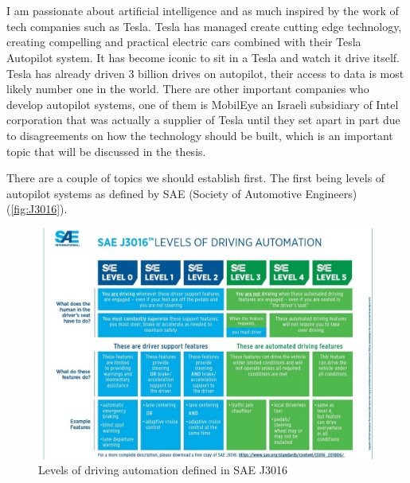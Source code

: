 \chapter{\bevezetes}

I am passionate about artificial intelligence and as much inspired by the
work of tech companies such as Tesla. Tesla has managed create cutting edge
technology, creating compelling and practical electric cars combined with their
Tesla Autopilot system. It has become iconic to sit in a Tesla and watch it
drive itself. Tesla has already driven 3 billion drives on autopilot, their
access to data is most likely number one in the world. There are other important
companies who develop autopilot systems, one of them is MobilEye an Israeli
subsidiary of Intel corporation that was actually a supplier of Tesla until they
set apart in part due to disagreements on how the technology should be built,
which is an important topic that will be discussed in the thesis.

There are a couple of topics we should establish first. The first being levels
of autopilot systems as defined by SAE (Society of Automotive Engineers)
(\autoref{fig:J3016}). 

\begin{figure}[!ht]
    \centering
    \includegraphics[width=150mm, keepaspectratio]{figures/levels-of-ad.jpg}
    \caption{Levels of driving automation defined in SAE J3016~\cite{j3016b}}
    \label{fig:J3016}
\end{figure}

